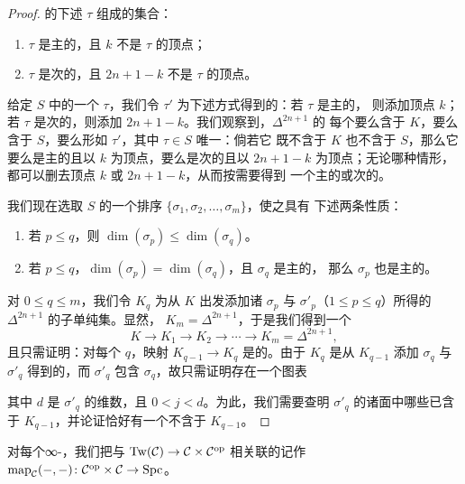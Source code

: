 \begin{proof}
的下述\trSimplex{} $\tau$ 组成的集合：
\begin{enumerate}[label=(\arabic*)]
  \item $\tau$ 是主的，且 $k$ 不是 $\tau$ 的顶点；
  \item $\tau$ 是次的，且 $2n+1-k$ 不是 $\tau$ 的顶点。
\end{enumerate}
给定 $S$ 中的一个\trSimplex{} $\tau$，我们令 $\tau'$ 为下述方式得到的\trSimplex{}：若 $\tau$ 是主的，
则添加顶点 $k$；若 $\tau$ 是次的，则添加 $2n+1-k$。我们观察到，$\Delta^{2n+1}$ 的
每个\trSimplex{}要么含于 $K$，要么含于 $S$，要么形如 $\tau'$，其中 $\tau \in S$ 唯一：倘若它
既不含于 $K$ 也不含于 $S$，那么它要么是主的且以 $k$ 为顶点，要么是次的且以
$2n+1-k$ 为顶点；无论哪种情形，都可以删去顶点 $k$ 或 $2n+1-k$，从而按需要得到
一个主的或次的\trSimplex{}。

我们现在选取 $S$ 的一个排序 $\{\sigma_1, \sigma_2, \dots, \sigma_m\}$，使之具有
下述两条性质：
\begin{enumerate}[label=(\arabic*)]
  \item 若 $p \le q$，则 $\dim(\sigma_p) \le \dim(\sigma_q)$。
  \item 若 $p \le q$，$\dim(\sigma_p) = \dim(\sigma_q)$，且 $\sigma_q$ 是主的，
        那么 $\sigma_p$ 也是主的。
\end{enumerate}
对 $0 \le q \le m$，我们令 $K_q$ 为从 $K$ 出发添加诸\trSimplex{} $\sigma_p$ 与
$\sigma'_p$（$1 \le p \le q$）所得的 $\Delta^{2n+1}$ 的子单纯集。显然，
$K_m = \Delta^{2n+1}$，于是我们得到一个\trFiltration{}%
\[
K \to K_1 \to K_2 \to \cdots \to K_m = \Delta^{2n+1},
\]
且只需证明：对每个 $q$，映射 $K_{q-1} \to K_q$ 是\trInnerAnodyne{}的。由于 $K_q$
是从 $K_{q-1}$ 添加\trSimplex{} $\sigma_q$ 与 $\sigma'_q$ 得到的，而 $\sigma'_q$ 包含
$\sigma_q$，故只需证明存在一个\trPushout{}图表
\begin{center}
\end{center}
其中 $d$ 是 $\sigma'_q$ 的维数，且 $0 < j < d$。为此，我们需要查明 $\sigma'_q$
的诸面中哪些已含于 $K_{q-1}$，并论证恰好有一个\trInnerFace{}不含于 $K_{q-1}$。
\end{proof}

\begin{definition}\label{def:map-bivariant}
对每个∞-\trCategory{}，我们把与\trRightFibration{}%
$\mathrm{Tw}(\mathcal{C}) \to \mathcal{C} \times \mathcal{C}^{\mathrm{op}}$ 相关联的\trFunctor{}记作
$\mathrm{map}_{\mathcal{C}}(-, -)\colon \mathcal{C}^{\mathrm{op}} \times \mathcal{C} \to \mathrm{Spc}$。
\end{definition}

